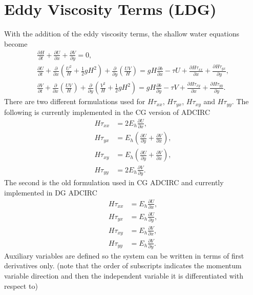 \documentclass[11pt]{article}
\begin{document}
\section{Eddy Viscosity Terms (LDG)}
With the addition of the eddy viscosity terms, the shallow water equations become
\begin{gather}
\frac{\partial H}{\partial t} + \frac{\partial U}{\partial x} + \frac{\partial V}{\partial y} = 0,\\
\frac{\partial U}{\partial t} + \frac{\partial}{\partial x}\left(\frac{U^2}{H} + \frac{1}{2}gH^2 \right) + \frac{\partial}{\partial y}\left(\frac{UV}{H} \right) = gH\frac{\partial b}{\partial x} - \tau U  + \frac{\partial H\tau_{xx}}{\partial x}  + \frac{\partial H\tau_{yx}}{\partial y},\\
\frac{\partial V}{\partial t} + \frac{\partial}{\partial x}\left(\frac{UV}{H} \right) + \frac{\partial}{\partial y}\left(\frac{V^2}{H} + \frac{1}{2}gH^2 \right) = gH\frac{\partial b}{\partial y} - \tau V + \frac{\partial H\tau_{xy}}{\partial x} + \frac{\partial H\tau_{yy}}{\partial y}.
\end{gather}
There are two different formulations used for $H\tau_{xx}$, $H\tau_{yx}$, $H\tau_{xy}$ and $H\tau_{yy}$.  The following is currently implemented in the CG version of ADCIRC
\begin{align}
H\tau_{xx} &= 2E_h\frac{\partial U}{\partial x}, \\
H\tau_{yx} &= E_h\left(\frac{\partial U}{\partial y} + \frac{\partial V}{\partial x} \right), \\
H\tau_{xy} &= E_h\left(\frac{\partial U}{\partial y} + \frac{\partial V}{\partial x} \right), \\
H\tau_{yy} &= 2E_h\frac{\partial V}{\partial y}.
\end{align}
The second is the old formulation used in CG ADCIRC and currently implemented in DG ADCIRC
\begin{align}
H\tau_{xx} &= E_h\frac{\partial U}{\partial x}, \\
H\tau_{yx} &= E_h\frac{\partial U}{\partial y}, \\
H\tau_{xy} &= E_h\frac{\partial V}{\partial x}, \\
H\tau_{yy} &= E_h\frac{\partial V}{\partial y}.
\end{align}
Auxiliary variables are defined so the system can be written in terms of first derivatives only. (note that the order of subscripts indicates the momentum variable direction and then the independent variable it is differentiated with respect to)
\end{document}
